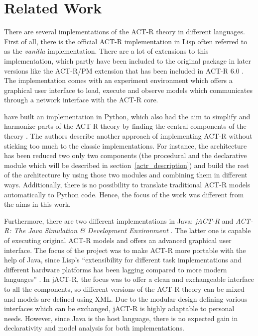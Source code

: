 \section{Related Work}

There are several implementations of the ACT-R theory in different languages. First of all, there is the official ACT-R implementation in Lisp \cite{actr_homepage} often referred to as the \emph{vanilla} implementation. There are a lot of extensions to this implementation, which partly have been included to the original package in later versions like the ACT-R/PM extension that has been included in ACT-R 6.0 \cite[264]{actr_reference}. The implementation comes with an experiment environment which offers a graphical user interface to load, execute and observe models which communicates through a network interface with the ACT-R core.

\citeauthor{stewart_deconstructing_2007} have built an implementation in Python, which also had the aim to simplify and harmonize parts of the ACT-R theory by finding the central components of the theory \cites{stewart_deconstructing_2006,stewart_deconstructing_2007}. The authors describe another approach of implementing ACT-R without sticking too much to the classic implementations. For instance, the architecture has been reduced two only two components (the procedural and the declarative module which will be described in section~\ref{actr_description}) and build the rest of the architecture by using those two modules and combining them in different ways. Additionally, there is no possibility to translate traditional ACT-R models automatically to Python code. Hence, the focus of the work was different from the aims in this work.

Furthermore, there are two different implementations in Java: \emph{jACT-R} \cite{jactr} and \emph{ACT-R: The Java Simulation \& Development Environment} \cite{java_actr}. The latter one is capable of executing original ACT-R models and offers an advanced graphical user interface. The focus of the project was to make ACT-R more portable with the help of Java, since Lisp's ``extensibility for different task implementations and different hardware platforms has been lagging compared to more modern languages'' \cite{java_actr_benefits}. In jACT-R, the focus was to offer a clean and exchangeable interface to all the components, so different versions of the ACT-R theory can be mixed \cite{jactr_benefits} and models are defined using XML. Due to the modular design defining various interfaces which can be exchanged, jACT-R is highly adaptable to personal needs. However, since Java is the host language, there is no expected gain in declarativity and model analysis for both implementations.

